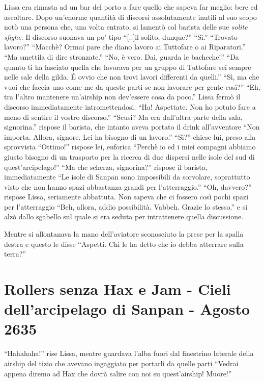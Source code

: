     Lissa era rimasta ad un bar del porto a fare quello che sapeva far
    meglio: bere ed ascoltare. Dopo un'enorme quantità di discorsi
    assolutamente inutili al suo scopo notò una persona che, una volta
    entrato, si lamentò col barista delle sue \emph{solite sfighe}. Il
    discorso suonava un po' tipo ``$[$..$]$il solito, dunque?'' ``Sì.''
    ``Trovato lavoro?'' ``Macchè? Ormai pare che diano lavoro ai Tuttofare
    o ai Riparatori.'' ``Ma smettila di dire stronzate.'' ``No, è vero.
    Dai, guarda le bacheche!'' ``Da quanto ti ha lasciato quella che
    lavorava per un gruppo di Tuttofare sei sempre nelle sale della gilda.
    \'E ovvio che non trovi lavori differenti da quelli.'' ``Sì, ma che
    vuoi che faccia uno come me da queste parti se non lavorare per gente
    così?'' ``Eh, tra l'altro mantenere un'airship non dev'essere cosa da
    poco.'' Lissa fermò il discorso immediatamente intromettendosi. ``Ha!
    Aspettate. Non ho potuto fare a meno di sentire il vostro discorso.''
    ``Scusi? Ma era dall'altra parte della sala, signorina.'' rispose il
    barista, che intanto aveva portato il drink all'avventore ``Non
    importa. Allora, signore. Lei ha bisogno di un lavoro.'' ``Sì?''
    chiese lui, preso alla sprovvista ``Ottimo!'' rispose lei, euforica
    ``Perchè io ed i miei compagni abbiamo giusto bisogno di un trasporto
    per la ricerca di due dispersi nelle isole del sud di
    quest'arcipelago!'' ``Ma che scherza, signorina?'' rispose il barista,
    immediatamente ``Le isole di Sanpan sono impossibili da sorvolare,
    soprattutto visto che non hanno spazi abbastanza grandi per
    l'atterraggio.'' ``Oh, davvero?'' rispose Lissa, seriamente abbattuta.
    Non sapeva che ci fossero così pochi spazi per l'atterraggio ``Beh,
    allora, addio possibilità. Vabbeh. Grazie lo stesso.'' e si alzò dallo
    sgabello sul quale si era seduta per intrattenere quella discussione.

    Mentre si allontanava la mano dell'aviatore sconosciuto la prese per la
    spalla destra e questo le disse ``Aspetti. Chi le ha detto che io debba
    atterrare sulla terra?''

  \section{Rollers senza Hax e Jam - Cieli dell'arcipelago di Sanpan -
    Agosto 2635}
    
    ``Hahahaha!'' rise Lissa, mentre guardava l'alba fuori dal finestrino laterale
    della airship del tizio che avevano ingaggiato per portarli da quelle
    parti ``Vedrai appena diremo ad Hax che dovrà salire con noi su
    quest'airship! Muore!''

